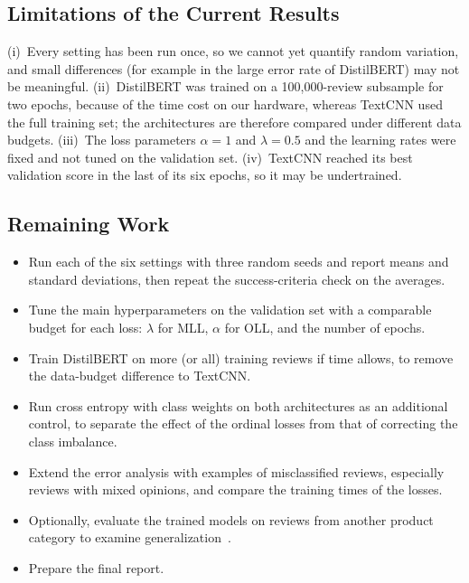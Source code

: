 \subsection{Limitations of the Current Results}
(i)~Every setting has been run once, so we cannot yet quantify random variation, and small differences (for example in the large error rate of DistilBERT) may not be meaningful. (ii)~DistilBERT was trained on a 100{,}000-review subsample for two epochs, because of the time cost on our hardware, whereas TextCNN used the full training set; the architectures are therefore compared under different data budgets. (iii)~The loss parameters $\alpha=1$ and $\lambda=0.5$ and the learning rates were fixed and not tuned on the validation set. (iv)~TextCNN reached its best validation score in the last of its six epochs, so it may be undertrained.

\subsection{Remaining Work}
\begin{itemize}
\item Run each of the six settings with three random seeds and report means and standard deviations, then repeat the success-criteria check on the averages.
\item Tune the main hyperparameters on the validation set with a comparable budget for each loss: $\lambda$ for MLL, $\alpha$ for OLL, and the number of epochs.
\item Train DistilBERT on more (or all) training reviews if time allows, to remove the data-budget difference to TextCNN.
\item Run cross entropy with class weights on both architectures as an additional control, to separate the effect of the ordinal losses from that of correcting the class imbalance.
\item Extend the error analysis with examples of misclassified reviews, especially reviews with mixed opinions, and compare the training times of the losses.
\item Optionally, evaluate the trained models on reviews from another product category to examine generalization~\cite{blitzer2007}.
\item Prepare the final report.
\end{itemize}
